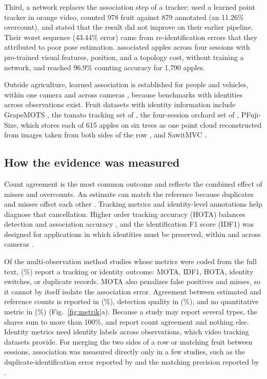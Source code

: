 Third, a network replaces the association step of a tracker: \citet{santos2026multi} used a learned point tracker in orange video, counted 978 fruit against 879 annotated (an 11.26\% overcount), and stated that the result did not improve on their earlier pipeline. Their worst sequence (43.44\% error) came from re-identification errors that they attributed to poor pose estimation. \citet{lei2025spatio} associated apples across four sessions with pre-trained visual features, position, and a topology cost, without training a network, and reached 96.9\% counting accuracy for 1{,}790 apples.

Outside agriculture, learned association is established for people and vehicles, within one camera \citep{braso2020learning} and across cameras \citep{ristani2016performance,tang2019cityflow}, because benchmarks with identities across observations exist. Fruit datasets with identity information include GrapeMOTS \citep{arizasentis2024grapemots}, the tomato tracking set of \citet{qi2025assessment}, the four-session orchard set of \citet{lei2025spatio}, PFuji-Size, which stores each of 615 apples on six trees as one point cloud reconstructed from images taken from both sides of the row \citep{genemola2021pfuji}, and SawitMVC \citep{indriani2026sawitmvc}.

\subsection{How the evidence was measured}\label{sec:mech-measure}
Count agreement is the most common outcome and reflects the combined effect of misses and overcounts. An estimate can match the reference because duplicates and misses offset each other \citep{rapadorincon2023development,wang2019mango}. Tracking metrics and identity-level annotations help diagnose that cancellation. Higher order tracking accuracy (HOTA) balances detection and association accuracy \citep{luiten2021hota}, and the identification F1 score (IDF1) was designed for applications in which identities must be preserved, within and across cameras \citep{ristani2016performance}.

Of the \nMethodMetric multi-observation method studies whose metrics were coded from the full text, \nMetIdent (\pMetIdent\%) report a tracking or identity outcome: MOTA, IDF1, HOTA, identity switches, or duplicate records. MOTA also penalizes false positives and misses, so it cannot by itself isolate the association error. Agreement between estimated and reference counts is reported in \nMetCount (\pMetCount\%), detection quality in \nMetDet (\pMetDet\%), and no quantitative metric in \nMetNone (\pMetNone\%) (Fig.~\ref{fig:metrik}a). Because a study may report several types, the shares sum to more than 100\%, and \nMetCountOnly report count agreement and nothing else. Identity metrics need identity labels across observations, which video tracking datasets provide. For merging the two sides of a row or matching fruit between sessions, association was measured directly only in a few studies, such as the duplicate-identification error reported by \citet{gongal2016apple} and the matching precision reported by \citet{lei2025spatio}.

